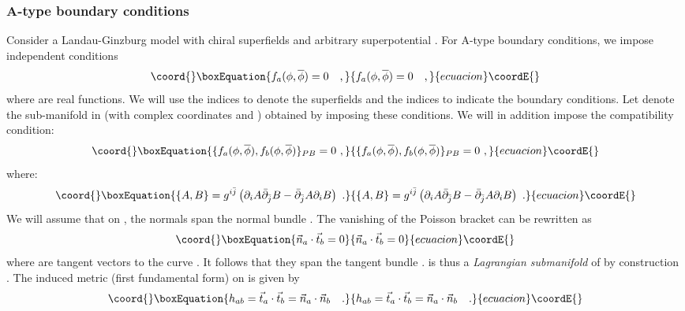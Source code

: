 \documentclass[a4paper,12pt]{article}
\def\Bbb{\mathbb}
\def\BC{\mbox{\myHighlight{$\Bbb C$}\coordHE{}}} \def\BP{\mbox{\myHighlight{$\Bbb P$}\coordHE{}}}
\begin{document}
\subsubsection{A-type boundary conditions}
Consider a Landau-Ginzburg model with \coordHE{} chiral
superfields \coordHE{} and arbitrary superpotential \coordHE{}. 
For A-type boundary conditions, we impose \coordHE{} independent conditions
\begin{equation}\coord{}\boxEquation{
f_a(\phi,\overline{\phi})=0\quad,
}{
f_a(\phi,\overline{\phi})=0\quad,
}{ecuacion}\coordE{}\end{equation}
where \coordHE{} are real functions. We will use the indices \coordHE{} to
denote the superfields and the indices \coordHE{} to indicate the
boundary conditions.
Let \myHighlight{$\Sigma$}\coordHE{} denote the sub-manifold in 
\myHighlight{$\BC^n$}\coordHE{} (with complex coordinates
\coordHE{} and \myHighlight{$\overline{\phi}$}\coordHE{}) obtained by imposing
these conditions. 
We will in addition impose the compatibility condition:
\begin{equation}\coord{}\boxEquation{
\{f_a(\phi,\overline{\phi}),f_b(\phi,\overline{\phi})\}_{PB}=0\ ,
}{
\{f_a(\phi,\overline{\phi}),f_b(\phi,\overline{\phi})\}_{PB}=0\ ,
}{ecuacion}\coordE{}\end{equation}
where:
\begin{equation}\coord{}\boxEquation{
	\{A,B\} = g^{i\bar{j}} \left( \partial_i A 
	\bar{\partial}_{\bar{j}} B -
	\bar{\partial}_{\bar{j}} A
	\partial_i B\right) \ .
}{
	\{A,B\} = g^{i\bar{j}} \left( \partial_i A 
	\bar{\partial}_{\bar{j}} B -
	\bar{\partial}_{\bar{j}} A
	\partial_i B\right) \ .
}{ecuacion}\coordE{}\end{equation}
We will assume that on \myHighlight{$\Sigma$}\coordHE{}, the normals \coordHE{} 
span the normal bundle \coordHE{}. The vanishing of the Poisson
bracket can be rewritten as
\begin{equation}\coord{}\boxEquation{
\vec{n}_a \cdot \vec{t}_b =0
}{
\vec{n}_a \cdot \vec{t}_b =0
}{ecuacion}\coordE{}\end{equation}
where 
\coordHE{}
are tangent vectors to the curve \coordHE{}. It follows that they span
the tangent bundle \coordHE{}. \myHighlight{$\Sigma$}\coordHE{} is thus a {\it Lagrangian
submanifold} of \myHighlight{$\BC^n$}\coordHE{} by construction 
\cite{harveylawson}. The induced
metric (first fundamental form) on \myHighlight{$\Sigma$}\coordHE{} is given by
\begin{equation}\coord{}\boxEquation{
h_{ab} = \vec{t}_a \cdot \vec{t}_b = \vec{n}_a \cdot \vec{n}_b \quad.
}{
h_{ab} = \vec{t}_a \cdot \vec{t}_b = \vec{n}_a \cdot \vec{n}_b \quad.
}{ecuacion}\coordE{}\end{equation}
\end{document}

